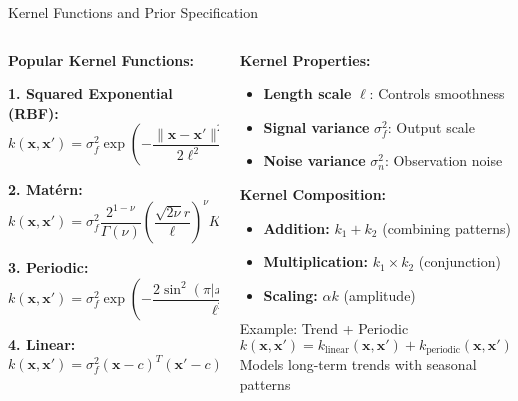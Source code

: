 \documentclass[aspectratio=169,11pt]{beamer}
\newcommand{\bx}{\mathbf{x}}
\begin{document}
\begin{frame}{Kernel Functions and Prior Specification}
\begin{columns}
\begin{column}{0.5\textwidth}
\textbf{Popular Kernel Functions:}

\textbf{1. Squared Exponential (RBF):}
\[k(\bx, \bx') = \sigma_f^2 \exp\left(-\frac{\|\bx - \bx'\|^2}{2\ell^2}\right)\]

\textbf{2. Matérn:}
\[k(\bx, \bx') = \sigma_f^2 \frac{2^{1-\nu}}{\Gamma(\nu)} \left(\frac{\sqrt{2\nu}r}{\ell}\right)^\nu K_\nu\left(\frac{\sqrt{2\nu}r}{\ell}\right)\]

\textbf{3. Periodic:}
\[k(\bx, \bx') = \sigma_f^2 \exp\left(-\frac{2\sin^2(\pi|x-x'|/p)}{\ell^2}\right)\]

\textbf{4. Linear:}
\[k(\bx, \bx') = \sigma_f^2 (\bx - c)^T(\bx' - c)\]
\end{column}
\begin{column}{0.5\textwidth}
\textbf{Kernel Properties:}
\begin{itemize}
\item \textbf{Length scale} $\ell$: Controls smoothness
\item \textbf{Signal variance} $\sigma_f^2$: Output scale
\item \textbf{Noise variance} $\sigma_n^2$: Observation noise
\end{itemize}

\vspace{0.3cm}
\textbf{Kernel Composition:}
\begin{itemize}
\item \textbf{Addition:} $k_1 + k_2$ (combining patterns)
\item \textbf{Multiplication:} $k_1 \times k_2$ (conjunction)
\item \textbf{Scaling:} $\alpha k$ (amplitude)
\end{itemize}

\begin{block}{Example: Trend + Periodic}
\[k(\bx, \bx') = k_{\text{linear}}(\bx, \bx') + k_{\text{periodic}}(\bx, \bx') + k_{\text{noise}}(\bx, \bx')\]
Models long-term trends with seasonal patterns
\end{block}
\end{column}
\end{columns}
\end{frame}
\end{document}
